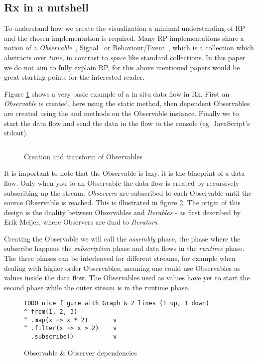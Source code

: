 \subsection{Rx in a nutshell}
To understand how we create the visualization a minimal understanding of RP and the chosen implementation is required. Many RP implementations share a notion of a \textit{Observable}~\cite{meijer2010subject}, Signal~\cite{czaplicki2012elm} or Behaviour/Event~\cite{elliott1997functional},  which is a collection which abstracts over \textit{time}, in contrast to \textit{space} like standard collections. In this paper we do not aim to fully explain RP, for this above mentioned papers would be great starting points for the interested reader.

Figure \ref{sample1} shows a very basic example of a in situ data flow in Rx. First an \textit{Observable} is created, here using the static  method, then dependent Observables are created using the  and  methods on the Observable instance. Finally we  to start the data flow and send the data in the flow to the console (eg. JavaScript's stdout).

\begin{figure}
\inputminted[tabsize=2]{javascript}{listings/sample1.js}	
\caption{Creation and transform of Observables}
\label{sample1}
\end{figure}

It is important to note that the Observable is lazy, it is the blueprint of a data flow. Only when you  to an Observable the data flow is created by recursively subscribing up the stream. \textit{Observer}s are subscribed to each Observable until the source Observable is reached.
This is illustrated in figure \ref{dualgraphs}.
The origin of this design is the duality between Observables and \textit{Iterables} - as first described by Erik Meijer, where Observers are dual to \textit{Iterators}.

Creating the Observable we will call the \textit{assembly} phase, the phase where the subscribe happens the \textit{subscription} phase and data flows in the \textit{runtime} phase. The three phases can be interleaved for different streams, for example when dealing with higher order Observables,  meaning one could use Observables as values inside the data flow. The Observables used as values have yet to start the second phase while the outer stream is in the runtime phase.

\begin{figure}
\begin{verbatim}
TODO nice figure with Graph & 2 lines (1 up, 1 down)
^ from(1, 2, 3)   			
^ .map(x => x * 2)       v
^ .filter(x => x > 2)    v
  .subscribe()           v
\end{verbatim}
\caption{Observable \& Observer dependencies}
\label{dualgraphs}
\end{figure}
